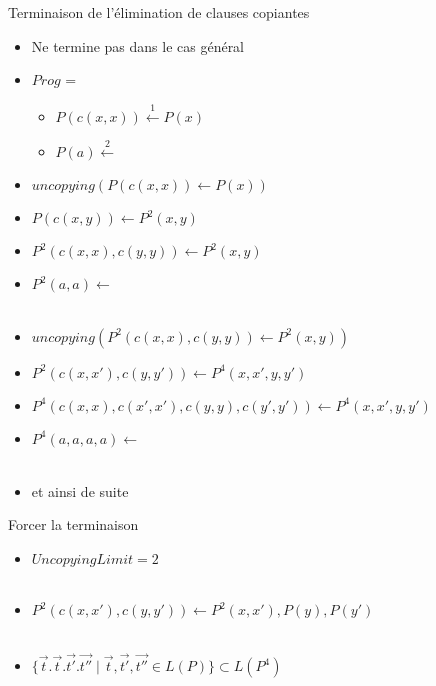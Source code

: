 \begin{frame}{Terminaison de l'élimination de clauses copiantes}
  \begin{itemize}[<+->]
  \item Ne termine pas dans le cas général
  \item $Prog$ =
    \begin{itemize}
    \item {}$P(c(x,x)) \stackrel{1}{\leftarrow} P(x)$
    \item {}$P(a) \stackrel{2}{\leftarrow} $
    \end{itemize}
    \vspace{\baselineskip}

  \item $uncopying(P(c(x,x)) \leftarrow P(x))$
  \item $P(c(x,y)) \leftarrow P^2(x, y)$
  \item {}$P^2(c(x,x),c(y,y)) \leftarrow P^2(x,y)$
  \item {}$P^2(a,a) \leftarrow $ \\~

  \item $uncopying(P^2(c(x,x), c(y,y)) \leftarrow P^2(x,y))$
  \item $P^2(c(x,x'), c(y,y')) \leftarrow P^4(x, x', y, y')$
  \item $P^4(c(x,x),c(x',x'),c(y,y),c(y',y')) \leftarrow P^4(x,x',y,y')$
  \item $P^4(a,a,a,a) \leftarrow $ \\~

  \item et ainsi de suite
  \end{itemize}
    
\end{frame}

\begin{frame}{Forcer la terminaison}
  \begin{itemize}[<+->]
  \item $UncopyingLimit = 2$ \\~

  \item $P^2(c(x,x'), c(y,y')) \leftarrow P^2(x, x'), P(y), P(y')$ \\~

  \item $\{ \vec{t}. \vec{t}. \vec{t'}. \vec{t''} \mid \vec{t},\vec{t'},\vec{t''} \in L(P) \} \subset L(P^4)$
  \end{itemize}
\end{frame}